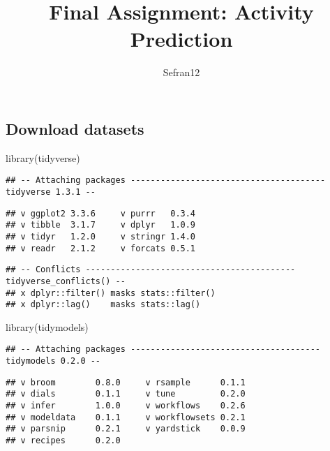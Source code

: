 \documentclass[
]{article}
\title{Final Assignment: Activity Prediction}
\author{Sefran12}
\date{}
\newenvironment{Shaded}{\begin{snugshade}}{\end{snugshade}}
\newcommand{\FunctionTok}[1]{\textcolor[rgb]{0.00,0.00,0.00}{#1}}
\newcommand{\NormalTok}[1]{#1}
\begin{document}
\maketitle

\hypertarget{download-datasets}{%
\subsection{Download datasets}\label{download-datasets}}

\begin{Shaded}
\begin{Highlighting}[]
\FunctionTok{library}\NormalTok{(tidyverse)}
\end{Highlighting}
\end{Shaded}

\begin{verbatim}
## -- Attaching packages --------------------------------------- tidyverse 1.3.1 --
\end{verbatim}

\begin{verbatim}
## v ggplot2 3.3.6     v purrr   0.3.4
## v tibble  3.1.7     v dplyr   1.0.9
## v tidyr   1.2.0     v stringr 1.4.0
## v readr   2.1.2     v forcats 0.5.1
\end{verbatim}

\begin{verbatim}
## -- Conflicts ------------------------------------------ tidyverse_conflicts() --
## x dplyr::filter() masks stats::filter()
## x dplyr::lag()    masks stats::lag()
\end{verbatim}

\begin{Shaded}
\begin{Highlighting}[]
\FunctionTok{library}\NormalTok{(tidymodels)}
\end{Highlighting}
\end{Shaded}

\begin{verbatim}
## -- Attaching packages -------------------------------------- tidymodels 0.2.0 --
\end{verbatim}

\begin{verbatim}
## v broom        0.8.0     v rsample      0.1.1
## v dials        0.1.1     v tune         0.2.0
## v infer        1.0.0     v workflows    0.2.6
## v modeldata    0.1.1     v workflowsets 0.2.1
## v parsnip      0.2.1     v yardstick    0.0.9
## v recipes      0.2.0
\end{verbatim}
\end{document}
